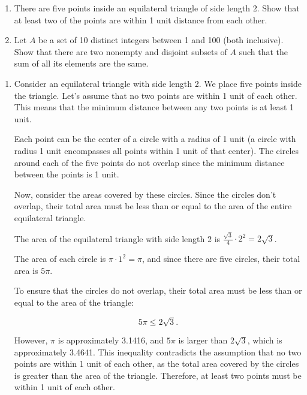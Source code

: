 \documentclass{article}
\theoremstyle{definition}
\begin{document}
\begin{question}
    \begin{enumerate}
	\item There are five points inside an equilateral triangle of side length 2. 
	Show that at least two of the points are within 1 unit distance from each other.
	\item Let $A$ be a set of 10 distinct integers between 1 and 100 (both inclusive). 
	Show that there are two nonempty and disjoint subsets of $A$ such that the sum of all its elements are the same.
    \end{enumerate}
\end{question}
\begin{solution}
\begin{enumerate}
    \item Consider an equilateral triangle with side length 2. We place five points inside the triangle. Let's assume that no two points are within 1 unit of each other. This means that the minimum distance between any two points is at least 1 unit.

    Each point can be the center of a circle with a radius of 1 unit (a circle with radius 1 unit encompasses all points within 1 unit of that center). The circles around each of the five points do not overlap since the minimum distance between the points is 1 unit.

    Now, consider the areas covered by these circles. Since the circles don't overlap, their total area must be less than or equal to the area of the entire equilateral triangle.

    The area of the equilateral triangle with side length 2 is $\frac{\sqrt{3}}{4} \cdot 2^2 = 2\sqrt{3}$. 

    The area of each circle is $\pi \cdot 1^2 = \pi$, and since there are five circles, their total area is $5\pi$.

    To ensure that the circles do not overlap, their total area must be less than or equal to the area of the triangle:

    \[5\pi \leq 2\sqrt{3}.\]

    However, $\pi$ is approximately 3.1416, and $5\pi$ is larger than $2\sqrt{3}$, which is approximately 3.4641. This inequality contradicts the assumption that no two points are within 1 unit of each other, as the total area covered by the circles is greater than the area of the triangle. Therefore, at least two points must be within 1 unit of each other.


\end{enumerate}
\end{solution}
\end{document}
